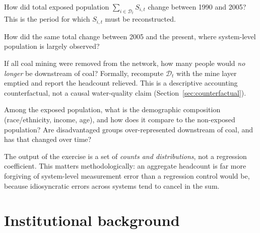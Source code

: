 \documentclass[11pt]{article}
\newcommand{\popserved}{\ensuremath{S}}
\begin{document}
\begin{description}[leftmargin=2em,style=nextline]
  \item[Q1. Pre-period change (1990--2005).] How did total exposed population
    $\sum_{i\in\mathcal{D}_t}\popserved_{i,t}$ change between 1990 and 2005? This is
    the period for which $\popserved_{i,t}$ must be reconstructed.
  \item[Q2. Recent change (2005--present).] How did the same total change between
    2005 and the present, where system-level population is largely observed?
  \item[Q3. No-coal counterfactual.] If all coal mining were removed from the
    network, how many people would \emph{no longer} be downstream of coal? Formally,
    recompute $\mathcal{D}_t$ with the mine layer emptied and report the headcount
    relieved. This is a descriptive accounting counterfactual, not a causal
    water-quality claim (Section~\ref{sec:counterfactual}).
  \item[Q4. Environmental justice.] Among the exposed population, what is the
    demographic composition (race/ethnicity, income, age), and how does it compare to
    the non-exposed population? Are disadvantaged groups over-represented downstream of
    coal, and has that changed over time?
\end{description}

The output of the exercise is a set of \emph{counts and distributions}, not a
regression coefficient. This matters methodologically: an aggregate headcount is far
more forgiving of system-level measurement error than a regression control would be,
because idiosyncratic errors across systems tend to cancel in the sum.

\section{Institutional background}
\label{sec:background}
\end{document}

